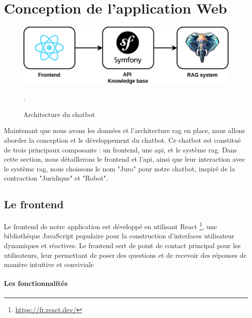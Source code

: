 \newpage
\section{Conception de l'application Web}

\begin{figure}[H]
    \centering
    \includegraphics[width=12cm]{gfx/fig-juro-architecture.png}
    \caption{Architecture du chatbot}.
    \label{fig:juro-architecture}
\end{figure}

Maintenant que nous avons les données et l'architecture \ac{rag} en place, nous allons aborder la conception et le développement du chatbot. Ce chatbot est constitué de trois principaux composants : un frontend, une \ac{api}, et le système \ac{rag}. Dans cette section, nous détaillerons le frontend et l'\ac{api}, ainsi que leur interaction avec le système \ac{rag}, nous choissons le nom "Juro" pour notre chatbot, inspiré de la contraction "Juridique" et "Robot".

\subsection{Le frontend}

Le frontend de notre application est développé en utilisant React \footnote{\href{https://fr.react.dev/}{https://fr.react.dev/}}, une bibliothèque JavaScript populaire pour la construction d'interfaces utilisateur dynamiques et réactives. Le frontend sert de point de contact principal pour les utilisateurs, leur permettant de poser des questions et de recevoir des réponses de manière intuitive et conviviale

\paragraph{Les fonctionnalités} \hspace{0pt}

